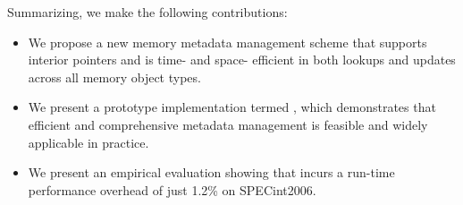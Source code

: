 Summarizing, we make the following contributions:

\begin{itemize}
\item We propose a new memory metadata management scheme that supports interior pointers
      and is time- and space- efficient in both lookups and updates across all memory object types.

\item We present a prototype implementation termed \projectname{},
      which demonstrates that efficient and comprehensive metadata management is feasible and widely applicable in practice.

\item We present an empirical evaluation showing that \projectname{} incurs a run-time performance overhead of just 1.2\% on SPECint2006.
  
\end{itemize}
